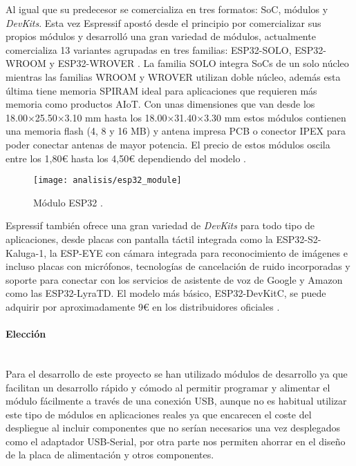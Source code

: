 \documentclass[../proyecto.tex]{subfiles}
\begin{document}
Al igual que su predecesor se comercializa en tres formatos: SoC, módulos y \textit{DevKits}. Esta vez Espressif apostó desde el principio por comercializar sus propios módulos y desarrolló una gran variedad de módulos, actualmente comercializa 13 variantes agrupadas en tres familias: ESP32-SOLO, ESP32-WROOM y ESP32-WROVER \cite{espressif_products_ordering_information}. La familia SOLO integra SoCs de un solo núcleo mientras las familias WROOM y WROVER utilizan doble núcleo, además esta última tiene memoria SPIRAM ideal para aplicaciones que requieren más memoria como productos AIoT. Con unas dimensiones que van desde los 18.00×25.50×3.10 mm hasta los 18.00×31.40×3.30 mm estos módulos contienen una memoria flash (4, 8 y 16 MB) y antena impresa PCB o conector IPEX para poder conectar antenas de mayor potencia. El precio de estos módulos oscila entre los 1,80€ hasta los 4,50€ dependiendo del modelo \cite{espressif_provider_digikey} \cite{espressif_provider_mouser}.\\

\begin{figure}[H]
\centering
\texttt{[image: analisis/esp32\_module]}
\caption{Módulo ESP32  \cite{esp32_module}.}
\label{fig:esp32_module}
\end{figure}

Espressif también ofrece una gran variedad de \textit{DevKits} para todo tipo de aplicaciones, desde placas con pantalla táctil integrada como la ESP32-S2-Kaluga-1, la ESP-EYE con cámara integrada para reconocimiento de imágenes e incluso placas con micrófonos, tecnologías de cancelación de ruido incorporadas y soporte para conectar con los servicios de asistente de voz de Google y Amazon como las ESP32-LyraTD. El modelo más básico, ESP32-DevKitC, se puede adquirir por aproximadamente 9€ en los distribuidores oficiales \cite{espressif_provider_digikey} \cite{espressif_provider_mouser}.\\

\paragraph{Elección}\mbox{}\\

Para el desarrollo de este proyecto se han utilizado módulos de desarrollo ya que facilitan un desarrollo rápido y cómodo al permitir programar y alimentar el módulo fácilmente a través de una conexión USB, aunque no es habitual utilizar este tipo de módulos en aplicaciones reales ya que encarecen el coste del despliegue al incluir componentes que no serían necesarios una vez desplegados como el adaptador USB-Serial, por otra parte nos permiten ahorrar en el diseño de la placa de alimentación y otros componentes.\\
\end{document}
